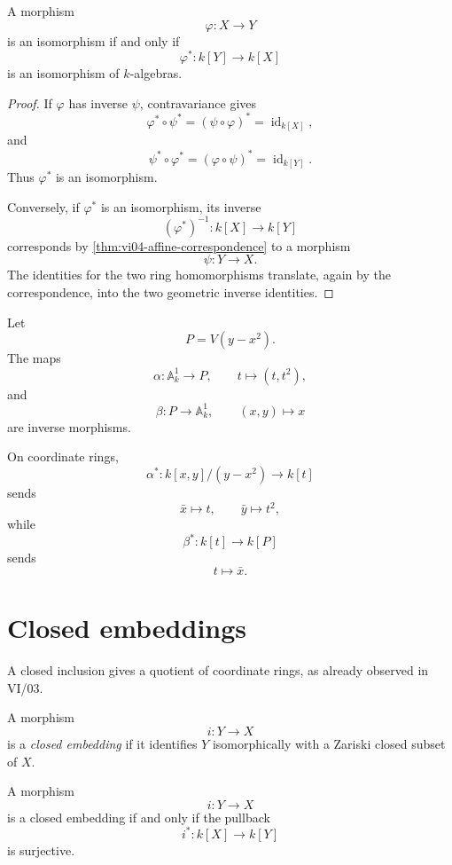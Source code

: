 \begin{theorem}
\label{thm:vi04-iso-criterion}
A morphism
\[
\varphi:X\to Y
\]
is an isomorphism if and only if
\[
\varphi^\ast:k[Y]\to k[X]
\]
is an isomorphism of \(k\)-algebras.
\end{theorem}

\begin{proof}
If \(\varphi\) has inverse \(\psi\), contravariance gives
\[
\varphi^\ast\circ\psi^\ast
=
(\psi\circ\varphi)^\ast
=
\operatorname{id}_{k[X]},
\]
and
\[
\psi^\ast\circ\varphi^\ast
=
(\varphi\circ\psi)^\ast
=
\operatorname{id}_{k[Y]}.
\]
Thus \(\varphi^\ast\) is an isomorphism.

Conversely, if \(\varphi^\ast\) is an isomorphism, its inverse
\[
(\varphi^\ast)^{-1}:k[X]\to k[Y]
\]
corresponds by \cref{thm:vi04-affine-correspondence} to a morphism
\[
\psi:Y\to X.
\]
The identities for the two ring homomorphisms translate, again by the correspondence, into
the two geometric inverse identities.
\end{proof}

\begin{example}
Let
\[
P=V(y-x^2).
\]
The maps
\[
\alpha:\mathbb A_k^1\to P,
\qquad
t\mapsto(t,t^2),
\]
and
\[
\beta:P\to\mathbb A_k^1,
\qquad
(x,y)\mapsto x
\]
are inverse morphisms.

On coordinate rings,
\[
\alpha^\ast:
k[x,y]/(y-x^2)\to k[t]
\]
sends
\[
\bar x\mapsto t,
\qquad
\bar y\mapsto t^2,
\]
while
\[
\beta^\ast:k[t]\to k[P]
\]
sends
\[
t\mapsto\bar x.
\]
\end{example}

\section{Closed embeddings}

A closed inclusion gives a quotient of coordinate rings, as already observed in VI/03.

\begin{definition}
A morphism
\[
i:Y\to X
\]
is a \emph{closed embedding} if it identifies \(Y\) isomorphically with a Zariski closed
subset of \(X\).
\end{definition}

\begin{theorem}
\label{thm:vi04-closed-embedding-surjection}
A morphism
\[
i:Y\to X
\]
is a closed embedding if and only if the pullback
\[
i^\ast:k[X]\to k[Y]
\]
is surjective.
\end{theorem}

